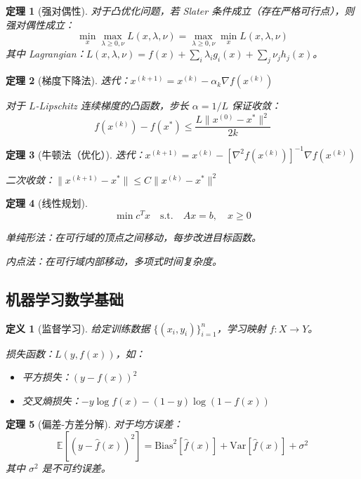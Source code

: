\documentclass[12pt]{article}
\newtheorem{theorem}{定理}[section]
\newtheorem{definition}{定义}[section]
\begin{document}
\begin{theorem}[强对偶性]
对于凸优化问题，若 Slater 条件成立（存在严格可行点），则强对偶性成立：
$$\min_x \max_{\lambda \geq 0, \nu} L(x, \lambda, \nu) = \max_{\lambda \geq 0, \nu} \min_x L(x, \lambda, \nu)$$
其中 Lagrangian：$L(x, \lambda, \nu) = f(x) + \sum_i \lambda_i g_i(x) + \sum_j \nu_j h_j(x)$。
\end{theorem}

\begin{theorem}[梯度下降法]
迭代：$x^{(k+1)} = x^{(k)} - \alpha_k \nabla f(x^{(k)})$

对于 $L$-Lipschitz 连续梯度的凸函数，步长 $\alpha = 1/L$ 保证收敛：
$$f(x^{(k)}) - f(x^*) \leq \frac{L\|x^{(0)} - x^*\|^2}{2k}$$
\end{theorem}

\begin{theorem}[牛顿法（优化）]
迭代：$x^{(k+1)} = x^{(k)} - [\nabla^2 f(x^{(k)})]^{-1} \nabla f(x^{(k)})$

二次收敛：$\|x^{(k+1)} - x^*\| \leq C\|x^{(k)} - x^*\|^2$
\end{theorem}

\begin{theorem}[线性规划]
$$\min c^T x \quad \text{s.t.} \quad Ax = b, \quad x \geq 0$$

单纯形法：在可行域的顶点之间移动，每步改进目标函数。

内点法：在可行域内部移动，多项式时间复杂度。
\end{theorem}

\subsection{机器学习数学基础}

\begin{definition}[监督学习]
给定训练数据 $\{(x_i, y_i)\}_{i=1}^n$，学习映射 $f: X \to Y$。

损失函数：$L(y, f(x))$，如：
\begin{itemize}
\item 平方损失：$(y - f(x))^2$
\item 交叉熵损失：$-y\log f(x) - (1-y)\log(1-f(x))$
\end{itemize}
\end{definition}

\begin{theorem}[偏差-方差分解]
对于均方误差：
$$\mathbb{E}[(y - \hat{f}(x))^2] = \text{Bias}^2[\hat{f}(x)] + \text{Var}[\hat{f}(x)] + \sigma^2$$
其中 $\sigma^2$ 是不可约误差。
\end{theorem}
\end{document}
